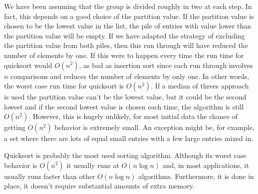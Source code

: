 \documentclass[11pt,a4paper]{scrartcl}
\begin{document}
We have been assuming that the group is divided roughly in two at each
step. In fact, this depends on a good choice of the partition
value. If the partition value is chosen to be the lowest value in the
list, the pile of entries with value lower than the partition value
will be empty. If we have adapted the strategy of excluding the
partition value from both piles, then this run through will have
reduced the number of elements by one. If this were to happen every
time the run time for quicksort would $O(n^2)$, as bad as insertion
sort since each run through involves $n$ comparisons and reduces the
number of elements by only one. In other words, the worst case run
time for quicksort is $O(n^2)$. If a median of threes approach is used
the partition value can't be the lowest value, but it could be the
second lowest and if the second lowest value is chosen each time, the
algorithm is still $O(n^2)$. However, this is hugely unlikely, for
most initial data the chance of getting $O(n^2)$ behavior is extremely
small. An exception might be, for example, a set where there are lots
of equal small entries with a few large entries mixed in.

Quicksort is probably the most used sorting algorithm. Although its
worst case behavior is $O(n^2)$ it usually runs at $O(n\log{n})$ and,
in most applications, it usually runs faster than other $O(n\log{n})$
algorithms. Furthermore, it is done in place, it doesn't require
substantial amounts of extra memory.
\end{document}
